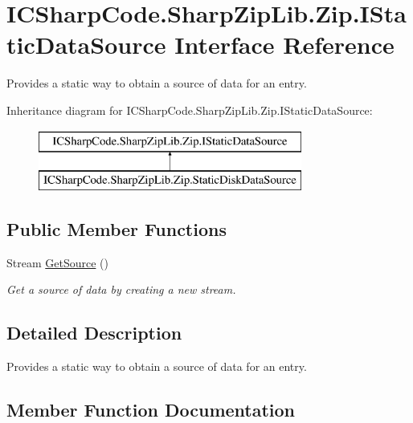 \hypertarget{interface_i_c_sharp_code_1_1_sharp_zip_lib_1_1_zip_1_1_i_static_data_source}{}\section{I\+C\+Sharp\+Code.\+Sharp\+Zip\+Lib.\+Zip.\+I\+Static\+Data\+Source Interface Reference}
\label{interface_i_c_sharp_code_1_1_sharp_zip_lib_1_1_zip_1_1_i_static_data_source}


Provides a static way to obtain a source of data for an entry.  


Inheritance diagram for I\+C\+Sharp\+Code.\+Sharp\+Zip\+Lib.\+Zip.\+I\+Static\+Data\+Source\+:\begin{figure}[H]
\begin{center}
\leavevmode
\includegraphics[height=2.000000cm]{interface_i_c_sharp_code_1_1_sharp_zip_lib_1_1_zip_1_1_i_static_data_source}
\end{center}
\end{figure}
\subsection*{Public Member Functions}
\begin{DoxyCompactItemize}
\item 
Stream \hyperlink{interface_i_c_sharp_code_1_1_sharp_zip_lib_1_1_zip_1_1_i_static_data_source_a9f27e7ccbb6a231d3836ba1e09631733}{Get\+Source} ()
\begin{DoxyCompactList}\small\item\em Get a source of data by creating a new stream. \end{DoxyCompactList}\end{DoxyCompactItemize}


\subsection{Detailed Description}
Provides a static way to obtain a source of data for an entry. 



\subsection{Member Function Documentation}
\mbox{\label{interface_i_c_sharp_code_1_1_sharp_zip_lib_1_1_zip_1_1_i_static_data_source_a9f27e7ccbb6a231d3836ba1e09631733}} 
